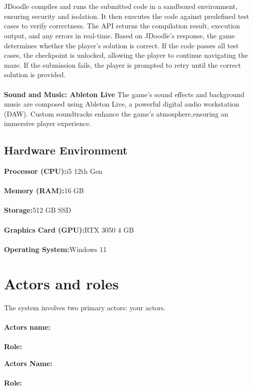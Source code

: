 \\\\
JDoodle compiles and runs the submitted code in a sandboxed environment, ensuring security and isolation. It then executes the code against predefined test cases to verify correctness. The API returns the compilation result, execution output, and any errors in real-time. Based on JDoodle's response, the game determines whether the player's solution is correct. If the code passes all test cases, the checkpoint is unlocked, allowing the player to continue navigating the maze. If the submission fails, the player is prompted to retry until the correct solution is provided.\\\\
\textbf{Sound and Music: Ableton Live}
The game’s sound effects and background music are composed using Ableton Live, a powerful digital audio workstation (DAW). Custom soundtracks enhance the game’s atmosphere,ensuring an immersive player experience.
 
 
 \subsection{Hardware Environment}
 \textbf{Processor (CPU):}i5 12th Gen\\\\
 \textbf{Memory (RAM):}16 GB\\\\
 \textbf{Storage:}512 GB SSD\\\\
 \textbf{Graphics Card (GPU):}RTX 3050 4 GB\\\\
 \textbf{Operating System:}Windows 11
 \newpage
 
 \section{Actors and roles}
 The system involves two primary actors: your actors.\\\\
\noindent
\textbf{Actors name:}
\\\\
 \textbf{Role:}
 \begin{itemize}

 \end{itemize}
\noindent
\textbf{Actors Name:}
\\\\
\textbf{Role:}
\begin{itemize}

\end{itemize}
 
 